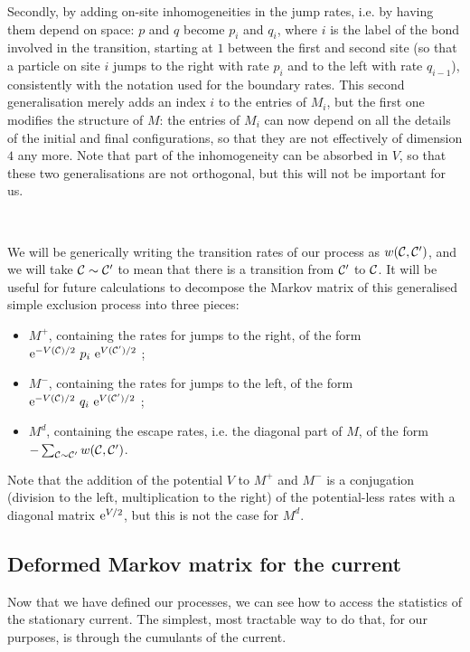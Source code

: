\documentclass[aps,pre,onecolumn,showpacs,showkeys,a4paper]{revtex4-1}
\begin{document}
Secondly, by adding on-site inhomogeneities in the jump rates, i.e. by having them depend on space: $p$ and $q$ become $p_i$ and $q_i$, where $i$ is the label of the bond involved in the transition, starting at $1$ between the first and second site (so that a particle on site $i$ jumps to the right with rate $p_i$ and to the left with rate $q_{i-1}$), consistently with the notation used for the boundary rates. This second generalisation merely adds an index $i$ to the entries of $M_i$, but the first one modifies the structure of $M$: the entries of $M_i$ can now depend on all the details of the initial and final configurations, so that they are not effectively of dimension $4$ any more. Note that part of the inhomogeneity can be absorbed in $V$, so that these two generalisations are not orthogonal, but this will not be important for us.


~

We will be generically writing the transition rates of our process as $w(\cal{C},\cal{C}')$, and we will take ${\cal C}\sim{\cal C}'$ to mean that there is a transition from ${\cal C}'$ to ${\cal C}$. It will be useful for future calculations to decompose the Markov matrix of this generalised simple exclusion process into three pieces:
\begin{itemize}
\item $M^+$, containing the rates for jumps to the right, of the form ${\rm e}^{-V({\cal C})/2}~p_i~{\rm e}^{V({\cal C}')/2}$ ;
\item $M^-$, containing the rates for jumps to the left, of the form ${\rm e}^{-V({\cal C})/2}~q_i~{\rm e}^{V({\cal C}')/2}$ ;
\item $M^d$, containing the escape rates, i.e. the diagonal part of $M$, of the form $-\sum_{{\cal C}\sim{\cal C}'}w(\cal{C},\cal{C}')$.
\end{itemize}
Note that the addition of the potential $V$ to $M^+$ and $M^-$ is a conjugation (division to the left, multiplication to the right) of the potential-less rates with a diagonal matrix ${\rm e}^{V/2}$, but this is not the case for $M^d$.



\subsection{Deformed Markov matrix for the current}
\label{IIb}

Now that we have defined our processes, we can see how to access the statistics of the stationary current. The simplest, most tractable way to do that, for our purposes, is through the cumulants of the current.
\end{document}
